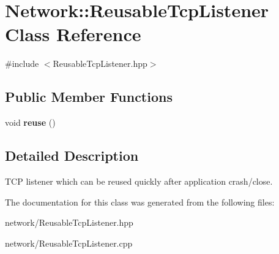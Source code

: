 \hypertarget{classNetwork_1_1ReusableTcpListener}{\section{\-Network\-:\-:\-Reusable\-Tcp\-Listener \-Class \-Reference}
\label{classNetwork_1_1ReusableTcpListener}
}


{\ttfamily \#include $<$\-Reusable\-Tcp\-Listener.\-hpp$>$}

\subsection*{\-Public \-Member \-Functions}
\begin{DoxyCompactItemize}
\item 
\hypertarget{classNetwork_1_1ReusableTcpListener_aff79af101c95ec5d15e850af485e25f1_aff79af101c95ec5d15e850af485e25f1}{void {\bfseries reuse} ()}\label{classNetwork_1_1ReusableTcpListener_aff79af101c95ec5d15e850af485e25f1_aff79af101c95ec5d15e850af485e25f1}

\end{DoxyCompactItemize}


\subsection{\-Detailed \-Description}
\-T\-C\-P listener which can be reused quickly after application crash/close. 

\-The documentation for this class was generated from the following files\-:\begin{DoxyCompactItemize}
\item 
network/\-Reusable\-Tcp\-Listener.\-hpp\item 
network/\-Reusable\-Tcp\-Listener.\-cpp\end{DoxyCompactItemize}
